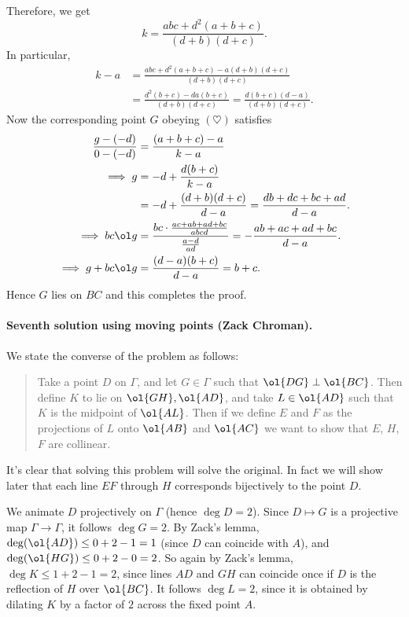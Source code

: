 Therefore, we get
\[ k = \frac{abc+d^2(a+b+c)}{(d+b)(d+c)}. \]
In particular,
\begin{align*}
  k-a &= \frac{abc+d^2(a+b+c)-a(d+b)(d+c)}{(d+b)(d+c)} \\
  &= \frac{d^2(b+c)-da(b+c)}{(d+b)(d+c)}
  = \frac{d(b+c)(d-a)}{(d+b)(d+c)}.
\end{align*}
Now the corresponding point $G$ obeying $(\heartsuit)$ satisfies
\begin{align*}
  \frac{g-(-d)}{0-(-d)} &= \frac{(a+b+c)-a}{k-a} \\
  \implies g &= -d + \frac{d(b+c)}{k-a} \\
  &= -d + \frac{(d+b)(d+c)}{d-a} = \frac{db+dc+bc+ad}{d-a}. \\
  \implies bc \ol g &= \frac{bc \cdot \frac{ac+ab+ad+bc}{abcd}}{\frac{a-d}{ad}}
  = -\frac{ab+ac+ad+bc}{d-a}. \\
  \implies g + bc \ol g &= \frac{(d-a)(b+c)}{d-a} = b+c.
\end{align*}
Hence $G$ lies on $BC$ and this completes the proof.


\paragraph{Seventh solution using moving points (Zack Chroman).}
We state the converse of the problem as follows:

\begin{quote}
Take a point $D$ on $\Gamma$,
and let $G\in \Gamma$ such that $\ol{DG} \perp \ol{BC}$.
Then define $K$ to lie on $\ol{GH}, \ol{AD}$,
and take $L \in \ol{AD}$ such that $K$ is the midpoint of $\ol{AL}$.
Then if we define $E$ and $F$ as the projections of $L$ onto $\ol{AB}$ and $\ol{AC}$
we want to show that $E$, $H$, $F$ are collinear.
\end{quote}

It's clear that solving this problem will solve the original.
In fact we will show later that each line $EF$ through $H$
corresponds bijectively to the point $D$.

We animate $D$ projectively on $\Gamma$
(hence $\deg D = 2$).
Since $D \mapsto G$ is a projective map $\Gamma \to \Gamma$,
it follows $\deg G = 2$.
By Zack's lemma, $\deg(\ol{AD}) \le 0 + 2 - 1 = 1$
(since $D$ can coincide with $A$),
and $\deg(\ol{HG}) \le 0 + 2 - 0 = 2$.
So again by Zack's lemma, $\deg K \le 1 + 2 - 1 = 2$,
since lines $AD$ and $GH$ can coincide once if $D$ is the reflection
of $H$ over $\ol{BC}$.
It follows $\deg L = 2$,
since it is obtained by dilating $K$ by a factor of $2$
across the fixed point $A$.

